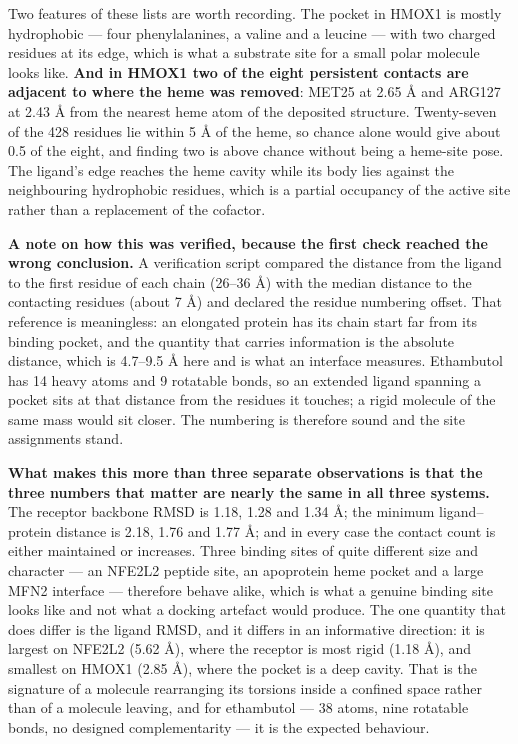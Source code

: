\documentclass[utf8]{FrontiersinVancouver}
\begin{document}
Two features of these lists are worth recording. The pocket in HMOX1 is mostly hydrophobic --- four phenylalanines, a valine and a leucine --- with two charged residues at its edge, which is what a substrate site for a small polar molecule looks like. \textbf{And in HMOX1 two of the eight persistent contacts are adjacent to where the heme was removed}: MET25 at 2.65 \AA{} and ARG127 at 2.43 \AA{} from the nearest heme atom of the deposited structure. Twenty-seven of the 428 residues lie within 5 \AA{} of the heme, so chance alone would give about 0.5 of the eight, and finding two is above chance without being a heme-site pose. The ligand's edge reaches the heme cavity while its body lies against the neighbouring hydrophobic residues, which is a partial occupancy of the active site rather than a replacement of the cofactor.

\textbf{A note on how this was verified, because the first check reached the wrong conclusion.} A verification script compared the distance from the ligand to the first residue of each chain (26--36 \AA{}) with the median distance to the contacting residues (about 7 \AA{}) and declared the residue numbering offset. That reference is meaningless: an elongated protein has its chain start far from its binding pocket, and the quantity that carries information is the absolute distance, which is 4.7--9.5 \AA{} here and is what an interface measures. Ethambutol has 14 heavy atoms and 9 rotatable bonds, so an extended ligand spanning a pocket sits at that distance from the residues it touches; a rigid molecule of the same mass would sit closer. The numbering is therefore sound and the site assignments stand.

\textbf{What makes this more than three separate observations is that the three numbers that matter are nearly the same in all three systems.} The receptor backbone RMSD is 1.18, 1.28 and 1.34 \AA{}; the minimum ligand--protein distance is 2.18, 1.76 and 1.77 \AA{}; and in every case the contact count is either maintained or increases. Three binding sites of quite different size and character --- an NFE2L2 peptide site, an apoprotein heme pocket and a large MFN2 interface --- therefore behave alike, which is what a genuine binding site looks like and not what a docking artefact would produce. The one quantity that does differ is the ligand RMSD, and it differs in an informative direction: it is largest on NFE2L2 (5.62 \AA{}), where the receptor is most rigid (1.18 \AA{}), and smallest on HMOX1 (2.85 \AA{}), where the pocket is a deep cavity. That is the signature of a molecule rearranging its torsions inside a confined space rather than of a molecule leaving, and for ethambutol --- 38 atoms, nine rotatable bonds, no designed complementarity --- it is the expected behaviour.
\end{document}
